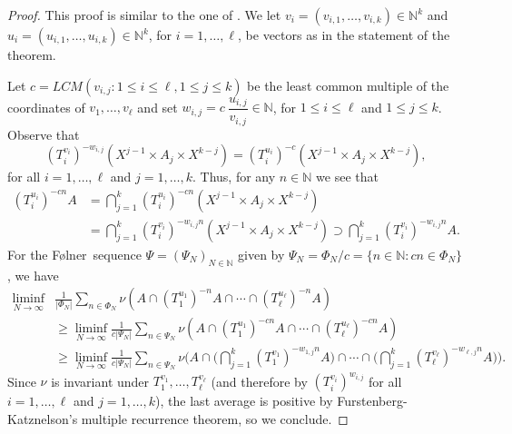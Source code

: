 \documentclass[letter, 11pt]{article}
\newcommand{\Folner}{F\o{}lner}
\theoremstyle{definition}
\theoremstyle{plain}
\newcommand{\N}{\mathbb{N}}
\newcommand{\1}{\mathbbm{1}}
\begin{document}
\begin{proof}
    This proof is similar to the one of \cite[Theorem 6.3]{kmrr25}. We let $v_i=(v_{i,1},\ldots, v_{i,k})\in \N^k$ and $u_i =  (u_{i,1} , \ldots, u_{i,k})\in \N^k$, for $i=1,\ldots,\ell$, be vectors as in the statement of the theorem. 
    
    Let $c= LCM(v_{i,j} \colon 1 \leq i \leq \ell, 1 \leq j \leq k)$ be the least common multiple of the coordinates of $v_1, \ldots, v_{\ell}$ and set $w_{i,j}= c \ \dfrac{u_{i,j}}{v_{i,j}} \in \N$, for $1\leq i\leq \ell$ and $1\leq j \leq k$. Observe that
\begin{equation*}
    (T_i^{v_i})^{-w_{i,j}}(X^{j-1} \times A_j \times X^{k-j}) = (T^{u_i}_i)^{-c}(X^{j-1} \times A_j \times X^{k-j}),
\end{equation*}
for all $i = 1, \ldots, \ell$ and $j=1, \ldots, k$. Thus, for any $n\in \N$ we see that 
\begin{align*}
   (T^{u_i}_i)^{-cn}A &= \bigcap_{j=1}^k (T^{u_i}_i)^{-cn}(X^{j-1} \times A_j \times X^{k-j}) \\
   &= \bigcap_{j=1}^k (T_i^{v_i})^{-w_{i,j}n}(X^{j-1} \times A_j \times X^{k-j}) \supset \bigcap_{j=1}^k (T_i^{v_i})^{-w_{i,j}n} A. 
\end{align*}
For the \Folner\ sequence $\Psi=(\Psi_N)_{N\in \N}$ given by $\Psi_N= \Phi_N/c = \{ n \in \N \colon cn \in \Phi_N \}$, we have 
\begin{align*}
    \liminf_{N \to \infty}& \frac{1}{|\Phi_N|} \sum_{n \in \Phi_N} \nu(A \cap (T^{u_1}_1)^{-n} A \cap \cdots \cap (T^{u_{\ell}}_{\ell})^{-n} A) \\
    &\geq \liminf_{N \to \infty} \frac{1}{c|\Psi_N|} \sum_{n \in \Psi_N} \nu(A \cap (T^{u_1}_1)^{-cn} A \cap \cdots \cap (T^{u_{\ell}}_{\ell})^{-cn} A) \\
    &\geq \liminf_{N \to \infty} \frac{1}{c|\Psi_N|} \sum_{n \in \Psi_N} \nu \Big(A \cap \Big(\bigcap_{j=1}^k (T_1^{v_1})^{-w_{1,j}n} A \Big)  \cap \cdots \cap \Big(\bigcap_{j=1}^k (T_{\ell}^{v_{\ell}})^{-w_{{\ell},j}n} A \Big) \Big).
\end{align*}
Since $\nu$ is invariant under $T_1^{v_1}, \ldots, T_{\ell}^{v_{\ell}}$ (and therefore by $(T_i^{v_i})^{w_{i,j}}$ for all $i = 1 , \ldots, \ell$ and $j = 1, \ldots, k $), the last average is positive by Furstenberg-Katznelson's multiple recurrence theorem, so we conclude. 
\end{proof}
\end{document}
